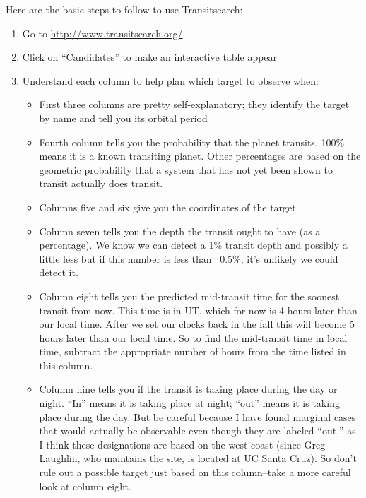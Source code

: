 \documentclass[12pt, preprint]{article}
\begin{document}
Here are the basic steps to follow to use Transitsearch:

\begin{enumerate}
\item Go to \url{http://www.transitsearch.org/}

\item Click on ``Candidates'' to make an interactive table appear

\item Understand each column to help plan which target to observe when:

\begin{itemize}
\item First three columns are pretty self-explanatory; they identify the target by name and tell you its orbital period

\item Fourth column tells you the probability that the planet transits.  100\% means it is a known transiting planet.  Other percentages are based on the geometric probability that a system that has not yet been shown to transit actually does transit.

\item Columns five and six give you the coordinates of the target

\item Column seven tells you the depth the transit ought to have (as a percentage).  We know we can detect a 1\% transit depth and possibly a little less but if this number is less than ~0.5\%, it's unlikely we could detect it.

\item Column eight tells you the predicted mid-transit time for the soonest transit from now.  This time is in UT, which for now is 4 hours later than our local time.  After we set our clocks back in the fall this will become 5 hours later than our local time.  So to find the mid-transit time in local time, subtract the appropriate number of hours from the time listed in this column.

\item Column nine tells you if the transit is taking place during the day or night.  ``In'' means it is taking place at night; ``out'' means it is taking place during the day.  But be careful because I have found marginal cases that would actually be observable even though they are labeled ``out,'' as I think these designations are based on the west coast (since Greg Laughlin, who maintains the site, is located at UC Santa Cruz).  So don't rule out a possible target just based on this column--take a more careful look at column eight.


\end{itemize}
\end{enumerate}
\end{document}
